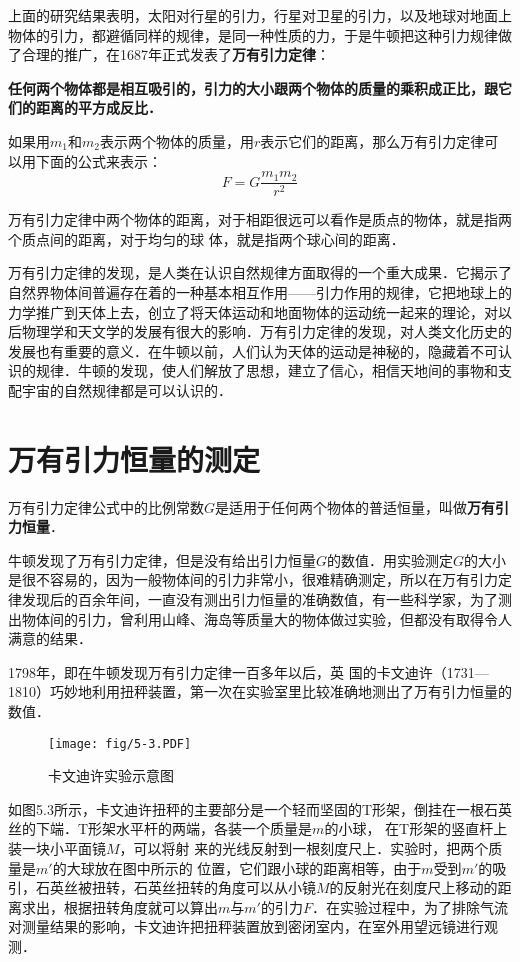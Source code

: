 上面的研究结果表明，太阳对行星的引力，行星对卫星的引力，以及地球对地面上物体的引力，都避循同样的规律，是同一种性质的力，于是牛顿把这种引力规律做了合理的推广，在1687年正式发表了\textbf{万有引力定律}：

\textbf{任何两个物体都是相互吸引的，引力的大小跟两个物体的质量的乘积成正比，跟它们的距离的平方成反比．}

如果用$m_1$和$m_2$表示两个物体的质量，用$r$表示它们的距离，那么万有引力定律可以用下面的公式来表示：
\[ F=G\frac{m_1m_2}{r^2}\]

万有引力定律中两个物体的距离，对于相距很远可以看作是质点的物体，就是指两个质点间的距离，对于均匀的球
体，就是指两个球心间的距离．

万有引力定律的发现，是人类在认识自然规律方面取得的一个重大成果．它揭示了自然界物体间普遍存在着的一种基本相互作用——引力作用的规律，它把地球上的力学推广到天体上去，创立了将天体运动和地面物体的运动统一起来的理论，对以后物理学和天文学的发展有很大的影响．万有引力定律的发现，对人类文化历史的发展也有重要的意义．在牛顿以前，人们认为天体的运动是神秘的，隐藏着不可认识的规律．牛顿的发现，使人们解放了思想，建立了信心，相信天地间的事物和支配宇宙的自然规律都是可以认识的．

\section{万有引力恒量的测定}
万有引力定律公式中的比例常数$G$是适用于任何两个物体的普适恒量，叫做\textbf{万有引力恒量}．

牛顿发现了万有引力定律，但是没有给出引力恒量$G$的数值．用实验测定$G$的大小是很不容易的，因为一般物体间的引力非常小，很难精确测定，所以在万有引力定律发现后的百余年间，一直没有测出引力恒量的准确数值，有一些科学家，为了测出物体间的引力，曾利用山峰、海岛等质量大的物体做过实验，但都没有取得令人满意的结果．

1798年，即在牛顿发现万有引力定律一百多年以后，英
国的卡文迪许（1731—1810）巧妙地利用扭秤装置，第一次在实验室里比较准确地测出了万有引力恒量的数值．

\begin{figure}[htp]
\centering\texttt{[image: fig/5-3.PDF]}
\caption{卡文迪许实验示意图}
\end{figure}

如图5.3所示，卡文迪许扭秤的主要部分是一个轻而坚固的T形架，倒挂在一根石英丝的下端．T形架水平杆的两端，各装一个质量是$m$的小球，
在T形架的竖直杆上装一块小平面镜$M$，可以将射
来的光线反射到一根刻度尺上．实验时，把两个质量是$m'$的大球放在图中所示的
位置，它们跟小球的距离相等，由于$m$受到$m'$的吸引，石英丝被扭转，石英丝扭转的角度可以从小镜$M$的反射光在刻度尺上移动的距离求出，根据扭转角度就可以算出$m$与$m'$的引力$F$．在实验过程中，为了排除气流对测量结果的影响，卡文迪许把扭秤装置放到密闭室内，在室外用望远镜进行观测．


